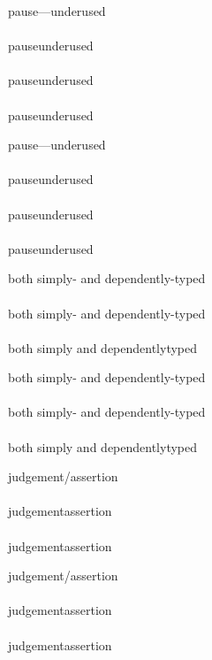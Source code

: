 \documentclass{article}
\begin{document}
\begin{verbatim*}
\begin{minipage}{0pt}
pause---underused\\\\
pause\textemdash{}underused\\\\
pause\mdash{}underused\\\\
pause\nbmdash{}underused\\
\end{minipage}
\end{verbatim*}
%
\begin{minipage}{0pt}
  pause---underused\\\\
  pause\textemdash{}underused\\\\
  pause\mdash{}underused\\\\
  pause\nbmdash{}underused\\
\end{minipage}

\begin{verbatim*}
\begin{minipage}{0pt}
both simply- and dependently-typed\\\\
both simply\hyp{} and dependently\hyp{}typed\\\\
both simply\nbhyp{} and dependently\nbhyp{}typed\\
\end{minipage}
\end{verbatim*}
%
\begin{minipage}{0pt}
  both simply- and dependently-typed\\\\
  both simply\hyp{} and dependently\hyp{}typed\\\\
  both simply\nbhyp{} and dependently\nbhyp{}typed\\
\end{minipage}

\begin{verbatim*}
\begin{minipage}{0pt}
judge\-ment/assertion\\\\
judge\-ment\fwdslash{}assertion\\\\
judge\-ment\nbfwdslash{}assertion\\
\end{minipage}
\end{verbatim*}
%
\begin{minipage}{0pt}
  judge\-ment/assertion\\\\
  judge\-ment\fwdslash{}assertion\\\\
  judge\-ment\nbfwdslash{}assertion\\
\end{minipage}
\end{document}
